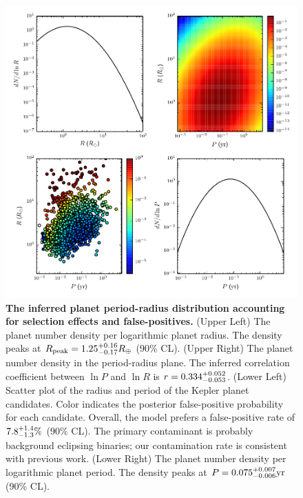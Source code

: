\documentclass{nature}
\newcommand{\Rpeak}{R_\mathrm{peak}}
\newcommand{\REarth}{R_\oplus}
\begin{document}
\begin{figure}
  \includegraphics[width=\columnwidth]{foreground-dist}
  \caption{\label{fig:foreground-dist} \textbf{The inferred planet
      period-radius distribution accounting for selection effects and
      false-positives.}  (Upper Left) The planet number density per
    logarithmic planet radius.  The density peaks at $\Rpeak =
    \rpeakrange \REarth$ (90\% CL).  (Upper Right) The planet
    number density in the period-radius plane.  The inferred
    correlation coefficient between $\ln P$ and $\ln R$ is $r =
    0.334_{-0.053}^{+0.052}$.  (Lower Left) Scatter plot of the radius
    and period of the Kepler planet candidates.  Color indicates the
    posterior false-positive probability for each candidate.  Overall,
    the model prefers a false-positive rate of $7.8_{-1.3}^{+1.4}\%$
    (90\% CL).  The primary contaminant is probably background
    eclipsing binaries; our contamination rate is consistent with
    previous work\cite{Fressin2013}. (Lower Right) The planet
    number density per logarithmic planet period.  The density peaks
    at $P = 0.075_{-0.006}^{+0.007} \mathrm{yr}$ (90\% CL).}
\end{figure}
\end{document}

